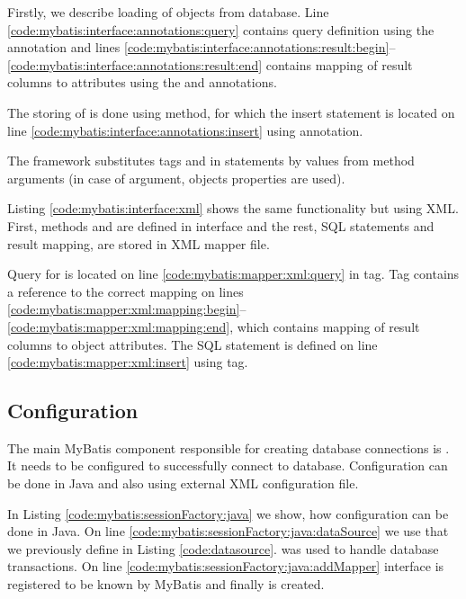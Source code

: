 Firstly, we describe loading of  objects from database.
Line \ref{code:mybatis:interface:annotations:query}
contains query definition using the  annotation and lines
\ref{code:mybatis:interface:annotations:result:begin}--\ref{code:mybatis:interface:annotations:result:end}
contains mapping of result columns to  attributes
using the  and  annotations.

The storing of  is done using  method,
for which the insert statement is located on line \ref{code:mybatis:interface:annotations:insert}
using  annotation.

The framework substitutes tags  and 
in statements by values from method arguments (in case of  argument,
objects properties are used).



Listing \ref{code:mybatis:interface:xml} shows the same functionality but using XML.
First, methods  and  are defined in  interface and the rest,
SQL statements and result mapping, are stored in XML mapper file.

Query for  is located on line \ref{code:mybatis:mapper:xml:query} in  tag.
Tag contains a reference to the correct  mapping on lines
\ref{code:mybatis:mapper:xml:mapping:begin}--\ref{code:mybatis:mapper:xml:mapping:end},
which contains mapping of result columns to  object attributes.
The  SQL statement is defined on line \ref{code:mybatis:mapper:xml:insert}
using  tag.




\subsection{Configuration \label{frameworks:myBatis:configuration}}

The main MyBatis component responsible for creating database connections
is . It needs to be configured to successfully connect
to database. Configuration can be done in Java and also using external XML configuration file.

In Listing \ref{code:mybatis:sessionFactory:java} we show, how configuration can be
done in Java. On line \ref{code:mybatis:sessionFactory:java:dataSource} we use 
that we previously define in Listing \ref{code:datasource}.
 was used to handle database transactions.
On line \ref{code:mybatis:sessionFactory:java:addMapper}  interface is registered
to be known by MyBatis and finally  is created.

